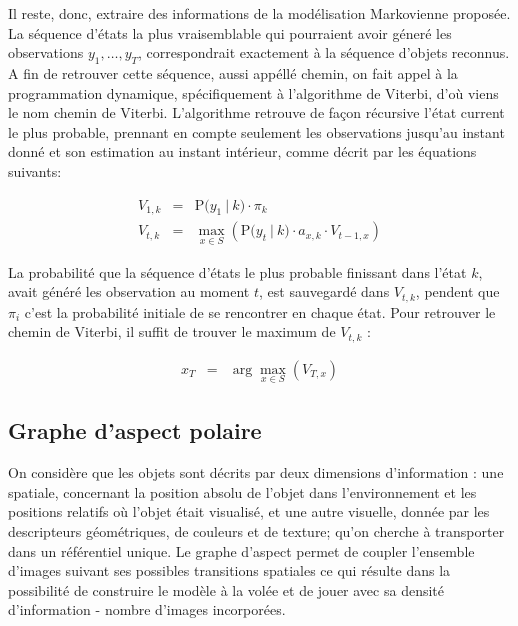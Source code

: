 Il reste, donc, extraire des informations de la modélisation Markovienne proposée.
La séquence d'états la plus vraisemblable qui pourraient avoir géneré
les observations  $y_1,\dots, y_T$, correspondrait exactement à la séquence d'objets reconnus.
A fin de retrouver cette séquence, aussi appéllé chemin, on fait 
appel à la programmation dynamique, spécifiquement à l'algorithme de Viterbi, d'où viens le nom chemin de Viterbi.
L'algorithme retrouve de façon récursive l'état current le plus probable, 
prennant en compte seulement les observations jusqu'au instant donné et son
estimation au instant intérieur, comme décrit par les équations suivants:

\begin{equation*}
  \begin{array}{rcl}
    V_{1,k} &=& \mathrm{P}\big( y_1 \ | \ k \big) \cdot \pi_k \\
    V_{t,k} &=& \max_{x \in S} \left(  \mathrm{P}\big( y_t \ | \ k \big) \cdot a_{x,k} \cdot V_{t-1,x}\right)
  \end{array}
\end{equation*}

La probabilité que la séquence d'états le plus probable finissant dans l'état $k$, avait généré les observation au moment $t$, est sauvegardé dans $V_{t,k}$, pendent que $\pi_i$ c'est la probabilité initiale de se rencontrer en chaque état. Pour retrouver le chemin de Viterbi, il suffit de trouver le maximum de $V_{t,k}$ :

\begin{equation*}
  \begin{array}{rcl}
    x_T &=& \arg\max_{x \in S} (V_{T,x})
  \end{array}
\end{equation*}

\subsection {Graphe d'aspect polaire}

On considère que les objets sont décrits par deux dimensions
d'information : une spatiale, concernant la position absolu de l'objet
dans l'environnement et les positions relatifs où l'objet était
visualisé, et une autre visuelle, donnée par les descripteurs
géométriques, de couleurs et de texture; qu'on cherche à transporter
dans un référentiel unique. Le graphe d'aspect permet de coupler
l'ensemble d'images suivant ses possibles transitions spatiales ce qui
résulte dans la possibilité de construire le modèle à la volée et de
jouer avec sa densité d'information - nombre d'images incorporées.

